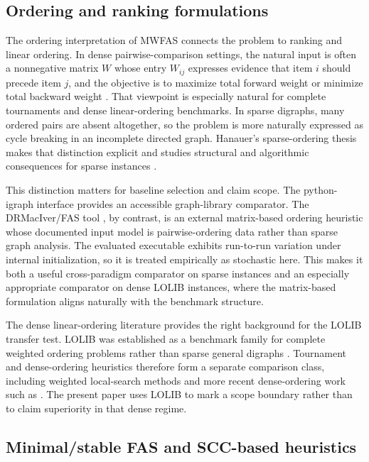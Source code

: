 \subsection{Ordering and ranking formulations}

The ordering interpretation of MWFAS connects the problem to ranking and linear ordering. In dense pairwise-comparison settings, the natural input is often a nonnegative matrix \(W\) whose entry \(W_{ij}\) expresses evidence that item \(i\) should precede item \(j\), and the objective is to maximize total forward weight or minimize total backward weight \cite{ACN08,CFR10,VahidiKoutis2024arxiv}. That viewpoint is especially natural for complete tournaments and dense linear-ordering benchmarks. In sparse digraphs, many ordered pairs are absent altogether, so the problem is more naturally expressed as cycle breaking in an incomplete directed graph. Hanauer's sparse-ordering thesis makes that distinction explicit and studies structural and algorithmic consequences for sparse instances \cite{Hanauer2017thesis}.

This distinction matters for baseline selection and claim scope. The python-igraph interface \cite{python_igraph_feedback_arc_set} provides an accessible graph-library comparator. The DRMacIver/FAS tool \cite{drmaciver_feedback_arc_set}, by contrast, is an external matrix-based ordering heuristic whose documented input model is pairwise-ordering data rather than sparse graph analysis. The evaluated executable exhibits run-to-run variation under internal initialization, so it is treated empirically as stochastic here. This makes it both a useful cross-paradigm comparator on sparse instances and an especially appropriate comparator on dense LOLIB instances, where the matrix-based formulation aligns naturally with the benchmark structure.

The dense linear-ordering literature provides the right background for the LOLIB transfer test. LOLIB was established as a benchmark family for complete weighted ordering problems rather than sparse general digraphs \cite{MRD12,lolib_library}. Tournament and dense-ordering heuristics therefore form a separate comparison class, including weighted local-search methods \cite{FLRS10} and more recent dense-ordering work such as \cite{OZ24}. The present paper uses LOLIB to mark a scope boundary rather than to claim superiority in that dense regime.

\subsection{Minimal/stable FAS and SCC-based heuristics}

